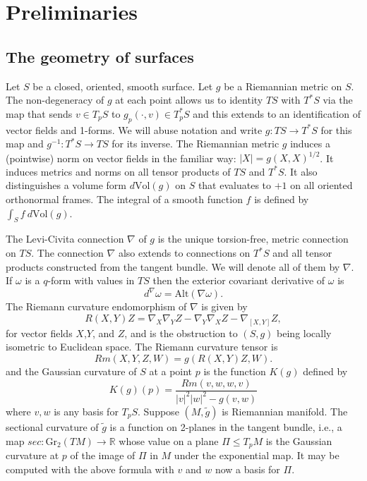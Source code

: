 \documentclass{amsart}
\newcommand{\R}{\mathbb{R}}
\begin{document}
\section{Preliminaries} \label{preliminaries}



\subsection{The geometry of surfaces}



Let $S$ be a closed, oriented, smooth surface. 
Let $g$ be a Riemannian metric on $S$.
The non-degeneracy of $g$ at each point allows us to identity $TS$ with $T^*S$ via the map that sends $v \in T_pS$ to $g_p(\cdot  , v) \in T_p^*S$ and this extends to an identification of vector fields and 1-forms. 
We will abuse notation and write $g: TS \to T^*S$ for this map and $g^{-1}: T^*S \to TS$ for its inverse. 
The Riemannian metric $g$ induces a (pointwise) norm on vector fields in the familiar way: $|X| = g(X,X)^{1/2}$. 
It induces metrics and norms on all tensor products of $TS$ and $T^*S$. It also distinguishes a volume form $d\mathrm{Vol}(g)$ on $S$ that evaluates to $+1$ on all oriented orthonormal frames. 
The integral of a smooth function $f$ is defined by $\int_S f \ d\mathrm{Vol}(g)$.


The Levi-Civita connection $\nabla$ of $g$ is the unique torsion-free, metric connection on $TS$. 
The connection $\nabla$ also extends to connections on $T^*S$ and all tensor products constructed from the tangent bundle.  
We will denote all of them by $\nabla$.
If $\omega$ is a $q$-form with values in $TS$ then the exterior covariant derivative of $\omega$ is 
\[
d^\nabla \omega = \mathrm{Alt}(\nabla \omega).
\]
The Riemann curvature endomorphism of $\nabla$ is given by  
\[
R(X,Y)Z 
= \nabla_X \nabla_Y Z - \nabla_Y \nabla_X Z - \nabla_{[X,Y]}Z,
\]
for vector fields $X$,$Y$, and $Z$, and is the obstruction to $(S,g)$ being locally isometric to Euclidean space. 
The Riemann curvature tensor is 
\[
Rm(X,Y,Z,W) = g(R(X,Y)Z,W).
\]
and the Gaussian curvature of $S$ at a point $p$ is the function $K(g)$ defined by 
\[
K(g)(p) = \frac{Rm(v,w,w,v)}{|v|^2|w|^2 - g(v,w)}
\]
where $v,w$ is any basis for $T_pS$.
Suppose $(M,\tilde{g})$ is Riemannian manifold. 
The sectional curvature of $\tilde{g}$ is a function on 2-planes in the tangent bundle, i.e., a map $sec: \mathrm{Gr}_2(TM) \to \R$ whose value on a plane $\Pi \leq T_pM$ is the Gaussian curvature at $p$ of the image of $\Pi$ in $M$ under the exponential map. 
It may be computed with the above formula with $v$ and $w$ now a basis for $\Pi$.
\end{document}
